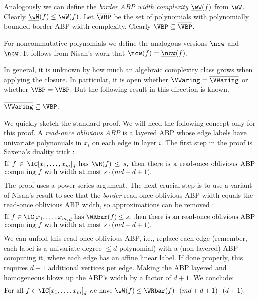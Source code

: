 Analogously we can define the \emph{border ABP width complexity} $\underline{\wW}(f)$ from $\wW$. Clearly $\underline{\wW}(f)\leq \wW(f)$.
Let $\overline{\VBP}$ be the set of polynomials with polynomially bounded border ABP width complexity. Clearly $\VBP \subseteq \overline{\VBP}$.

For noncommutative polynomials we define the analogous versions $\ncw$ and $\underline{\ncw}$. It follows from Nisan's work \cite{nisan1991lower} that $\ncw(f)=\underline{\ncw}(f)$.

In general, it is unknown by how much an algebraic complexity class grows when applying the closure. In particular, it is open whether $\VWaring = \overline{\VWaring}$ or whether $\VBP = \overline{\VBP}$.
But the following result in this direction is known.

\begin{theorem}\label{thm:borderwaringinVBP}
$\overline{\VWaring} \subseteq \VBP$.
\end{theorem}
We quickly sketch the standard proof.
We will need the following concept only for this proof.
A \emph{read-once oblivious ABP} is a layered ABP whose edge labels have univariate polynomials in $x_i$ on each edge in layer $i$.
The first step in the proof is Saxena's duality trick \cite[Lemma~1]{Sax:08}:
\begin{equation*}
\begin{minipage}{13cm}
If $f \in \IC[x_1,\ldots,x_m]_d$ has $\WR(f)\leq s$, then there is a read-once oblivious ABP computing $f$ with width at most $s\cdot(md+d+1)$.
\end{minipage}
\end{equation*}
The proof uses a power series argument.
The next crucial step is to use a variant of Nisan's result \cite{nisan1991lower} to see that the \emph{border} read-once oblivious ABP width equals the read-once oblivious ABP width, so approximations can be removed \cite[Sec.~4.5.2]{For:14}:
\begin{equation*}
\begin{minipage}{13cm}
If $f \in \IC[x_1,\ldots,x_m]_d$ has $\WRbar(f)\leq s$, then there is an read-once oblivious ABP computing $f$ with width at most $s\cdot(md+d+1)$.
\end{minipage}
\end{equation*}
We can unfold this read-once oblivious ABP, i.e., replace each edge (remember, each label is a univariate degree $\leq d$ polynomial) with a (non-layered) ABP computing it, where each edge has an affine linear label. If done properly, this requires $d-1$ additional vertices per edge.
Making the ABP layered and homogeneous blows up the ABP's width by a factor of $d+1$.
We conclude:
\begin{equation}\label{thm:theirsaxenaduality}
\begin{minipage}{13cm}
For all $f \in \IC[x_1,\ldots,x_m]_d$ we have $\wW(f) \leq \WRbar(f)\cdot(md+d+1)\cdot(d+1)$.
\end{minipage}
\end{equation}


